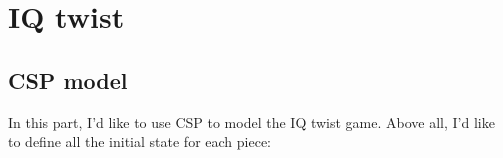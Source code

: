 \chapter{IQ twist}
\section{CSP model}
\newcommand{\VUnits} {\ensuremath{V_{units}}}
\newcommand{\VPegs} {\ensuremath{V_{pegs}}}
\newcommand{\Constraints}[2] {\ensuremath{C_{v_{#1},v_{#2}}}}
\newcommand{\Cons}[5] {\ensuremath{C_{v_{#1},v_{#2},v_{#3},v_{#4},v_{#5}}}}
\newcommand{\Con}[3] {\ensuremath{C_{v_{#1},v_{#2},v_{#3}}}}
\newcommand{\Const}[4] {\ensuremath{C_{v_{#1},v_{#2},v_{#3},v_{#4}}}}
\newcommand{\Constraint}[1] {\ensuremath{C_{v_{#1}}}}
\newcommand{\Domain}[1] {\ensuremath{D(v_{#1})}}
\label{sec:CSP model}
In this part, I'd like to use CSP to model the IQ twist game. Above all, I'd like to define all the initial state for each piece:
